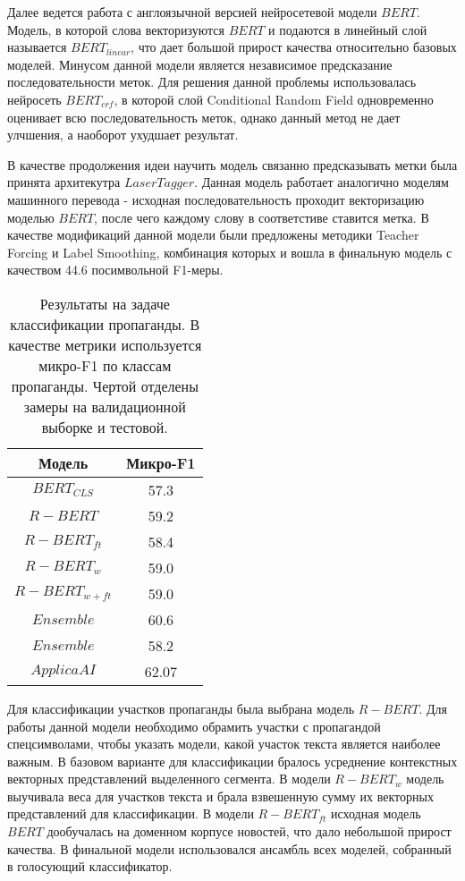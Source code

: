 Далее ведется работа с англоязычной версией нейросетевой модели $BERT$. Модель, в которой слова векторизуются $BERT$ и подаются в линейный слой называется $BERT_{linear}$, что дает большой прирост качества относительно базовых моделей. Минусом данной модели является независимое предсказание последовательности меток. Для решения данной проблемы использовалась нейросеть $BERT_{crf}$, в которой слой Conditional Random Field одновременно оценивает всю последовательность меток, однако данный метод не дает улчшения, а наоборот ухудшает результат.

В качестве продолжения идеи научить модель связанно предсказывать метки была принята архитекутра $LaserTagger$. Данная модель работает аналогично моделям машинного перевода - исходная последовательность проходит векторизацию моделью $BERT$, после чего каждому слову в соответстиве ставится метка. В качестве модификаций данной модели были предложены методики Teacher Forcing и Label Smoothing, комбинация которых и вошла в финальную модель с качеством 44.6 посимвольной F1-меры.


\begin{table}[h!]
\centering
\begin{tabular}{|| c | c |} 
 \hline
 Модель & Микро-F1 \\ [0.5ex] 
 \hline
 $BERT_{CLS}$ & 57.3 \\
 $R-BERT$ & 59.2 \\
 $R-BERT_{ft}$ & 58.4 \\
 $R-BERT_{w}$ & 59.0 \\
 $R-BERT_{w+ft}$ & 59.0 \\
 $Ensemble$ & 60.6 \\
 \hline
 $Ensemble$ & 58.2 \\
 $ApplicaAI$ & 62.07 \\
 \hline
\end{tabular}
\caption{Результаты на задаче классификации пропаганды. В качестве метрики используется микро-F1 по классам пропаганды. Чертой отделены замеры на валидационной выборке и тестовой.}
\label{table:1}
\end{table}

Для классификации участков пропаганды была выбрана модель $R-BERT$. Для работы данной модели необходимо обрамить участки с пропагандой спецсимволами, чтобы указать модели, какой участок текста является наиболее важным. В базовом варианте для классификации бралось усреднение контекстных векторных представлений выделенного сегмента. В модели $R-BERT_{w}$ модель выучивала веса для участков текста и брала взвешенную сумму их векторных представлений для классификации. В модели $R-BERT_{ft}$ исходная модель $BERT$ дообучалась на доменном корпусе новостей, что дало небольшой прирост качества. В финальной модели использовался ансамбль всех моделей, собранный в голосующий классификатор.


